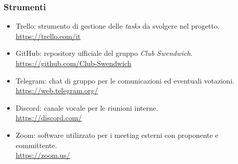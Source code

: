 \subsubsection{Strumenti}

\begin{itemize}
    \item Trello: strumento di gestione delle \textit{tasks} da svolgere nel progetto. \\
    \href{https://trello.com/it}{https://trello.com/it}
    \item GitHub: repository ufficiale del gruppo \textit{Club Swendwich}.\\
    \href{https://github.com/Club-Swendwich}{https://github.com/Club-Swendwich}
    \item Telegram: chat di gruppo per le comunicazioni ed eventuali votazioni. \\
    \href{https://web.telegram.org/}{https://web.telegram.org/}
    \item Discord: canale vocale per le riunioni interne.\\
    \href{https://discord.com/}{https://discord.com/}
    \item Zoom: software utilizzato per i meeting esterni con proponente e committente.\\
    \href{https://zoom.us/}{https://zoom.us/}
\end{itemize}